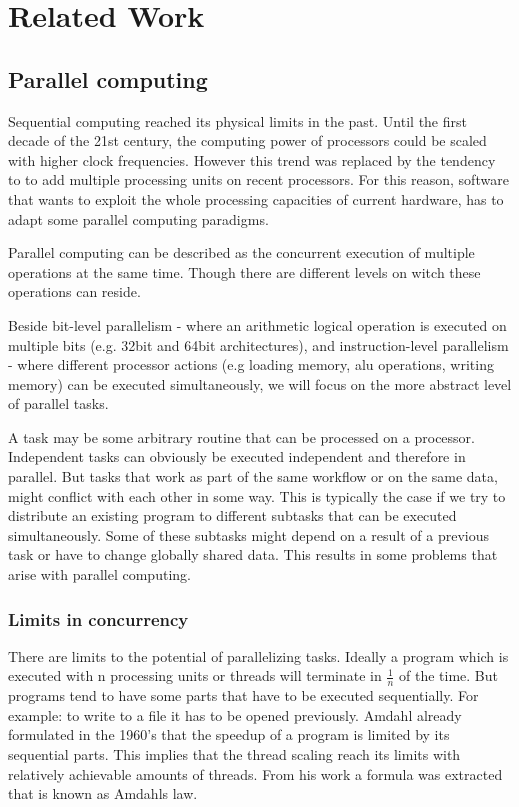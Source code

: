 \chapter{Related Work}

\section{Parallel computing}
Sequential computing reached its physical limits in the past. Until the first decade of the 21st century, the computing power of processors could be scaled with higher clock frequencies. However this trend was replaced by the tendency to to add multiple processing units on recent processors. For this reason, software that wants to exploit the whole processing capacities of current hardware, has to adapt some parallel computing paradigms.

Parallel computing can be described as the concurrent execution of multiple operations at the same time. Though there are different levels on witch these operations can reside.

Beside bit-level parallelism - where an arithmetic logical operation is executed on multiple bits (e.g. 32bit and 64bit architectures), and instruction-level parallelism \cite{wall1991limits} - where different processor actions (e.g loading memory, alu operations, writing memory) can be executed simultaneously, we will focus on the more abstract level of parallel tasks.

A task may be some arbitrary routine that can be processed on a processor. Independent tasks can obviously be executed independent and therefore in parallel. But tasks that work as part of the same workflow or on the same data, might conflict with each other in some way. This is typically the case if we try to distribute an existing program to different subtasks that can be executed simultaneously. Some of these subtasks might depend on a result of a previous task or have to change globally shared data. This results in some problems that arise with parallel computing.

\subsection{Limits in concurrency}
There are limits to the potential of parallelizing tasks. Ideally a program which is executed with n processing units or threads will terminate in $\frac{1}{n}$ of the time. But programs tend to have some parts that have to be executed sequentially. For example: to write to a file it has to be opened previously.
Amdahl already formulated in the 1960's \cite{amdahl1967validity} that the speedup of a program is limited by its sequential parts. This implies that the thread scaling reach its limits with relatively achievable amounts of threads. From his work a formula was extracted that is known as Amdahls law. 

